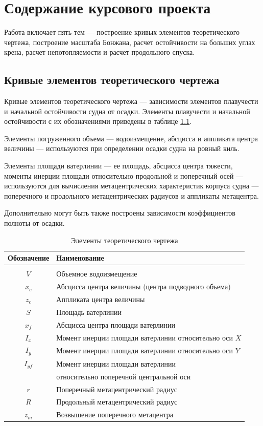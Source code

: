 \chapter{Содержание курсового проекта}

Работа включает пять тем --- построение кривых элементов теоретического чертежа, построение масштаба Бонжана, расчет остойчивости на больших углах крена, расчет непотопляемости и расчет продольного спуска.

\section{Кривые элементов теоретического чертежа}

Кривые элементов теоретического чертежа — зависимости элементов плавучести и начальной остойчивости судна от осадки.
Элементы плавучести и начальной остойчивости с их обозначениями приведены в таблице \ref{tab:elements}.

Элементы погруженного объема --- водоизмещение, абсцисса и аппликата центра величины — используются при определении осадки судна на ровный киль.

Элементы площади ватерлинии --- ее площадь, абсцисса центра тяжести, моменты инерции площади относительно продольной и поперечный осей --- используются для вычисления метацентрических характеристик корпуса судна --- поперечного и продольного метацентрических радиусов и аппликаты метацентра.

Дополнительно могут быть также построены зависимости коэффициентов полноты от осадки.

\begin{table}[h]
    \caption{Элементы теоретического чертежа}
    \label{tab:elements}
    \centering
    \small
    \begin{tabular}{ c  l  }
        Обозначение & Наименование \\ [1.5ex]
        \hline \\
        $V$ & Объемное водоизмещение \\ [1.5ex]
        $x_c$ & Абсцисса центра величины (центра подводного объема) \\ [1.5ex]
        $z_c$ & Аппликата центра величины \\ [1.5ex]
        $S$ & Площадь ватерлинии \\ [1.5ex]
        $x_f$ & Абсцисса центра площади ватерлинии \\ [1.5ex]
        $I_x$ & Момент инерции площади ватерлинии относительно оси $X$ \\ [1.5ex]
        $I_y$ & Момент инерции площади ватерлинии относительно оси $Y$ \\ [1.5ex]
        $I_{yf}$ & Момент инерции площади ватерлинии \\ [1.5ex]
         & относительно поперечной центральной оси \\ [1.5ex]
        $r$ & Поперечный метацентрический радиус\\ [1.5ex]
        $R$ & Продольный метацентрический радиус\\ [1.5ex]
        $z_m$ & Возвышение поперечного метацентра\\ [1.5ex]
    \end{tabular}
\end{table}

